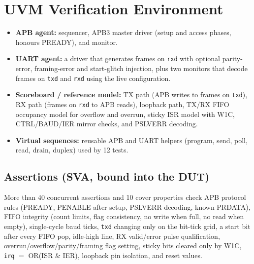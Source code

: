 \documentclass[11pt,a4paper]{article}
\newcommand{\sect}[1]{\section{\textcolor{accent}{#1}}}
\begin{document}
\sect{UVM Verification Environment}
\begin{itemize}
\item \textbf{APB agent:} sequencer, APB3 master driver (setup and access phases, honours PREADY), and monitor.
\item \textbf{UART agent:} a driver that generates frames on \texttt{rxd} with optional parity-error, framing-error and start-glitch injection, plus two monitors that decode frames on \texttt{txd} and \texttt{rxd} using the live configuration.
\item \textbf{Scoreboard / reference model:} TX path (APB writes to frames on \texttt{txd}), RX path (frames on \texttt{rxd} to APB reads), loopback path, TX/RX FIFO occupancy model for overflow and overrun, sticky ISR model with W1C, CTRL/BAUD/IER mirror checks, and PSLVERR decoding.
\item \textbf{Virtual sequences:} reusable APB and UART helpers (program, send, poll, read, drain, duplex) used by 12 tests.
\end{itemize}

\subsection*{Assertions (SVA, bound into the DUT)}
More than 40 concurrent assertions and 10 cover properties check APB protocol rules (PREADY, PENABLE after setup, PSLVERR decoding, known PRDATA), FIFO integrity (count limits, flag consistency, no write when full, no read when empty), single-cycle baud ticks, \texttt{txd} changing only on the bit-tick grid, a start bit after every FIFO pop, idle-high line, RX valid/error pulse qualification, overrun/overflow/parity/framing flag setting, sticky bits cleared only by W1C, \texttt{irq} $=$ OR(ISR \& IER), loopback pin isolation, and reset values.
\end{document}
